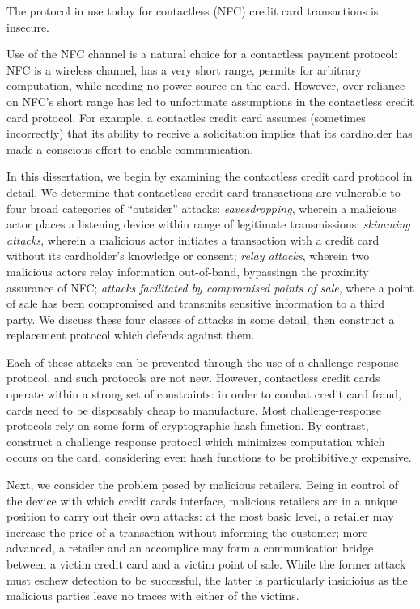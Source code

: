 The protocol in use today for contactless (NFC) credit card transactions is insecure.

Use of the NFC channel is a natural choice for a contactless payment protocol:
    NFC is a wireless channel, has a very short range, permits for arbitrary computation, while needing no power source on the card.
However, over-reliance on NFC's short range has led to unfortunate assumptions in the contactless credit card protocol.
For example, a contactles credit card assumes (sometimes incorrectly) that its ability to receive a solicitation implies that its cardholder has made a conscious effort to enable communication.

In this dissertation, we begin by examining the contactless credit card protocol in detail.
We determine that contactless credit card transactions are vulnerable to four broad categories of ``outsider'' attacks:
    \emph{eavesdropping}, wherein a malicious actor places a listening device within range of legitimate transmissions;
    \emph{skimming attacks}, wherein a malicious actor initiates a transaction with a credit card without its cardholder's knowledge or consent;
    \emph{relay attacks}, wherein two malicious actors relay information out-of-band, bypassingn the proximity assurance of NFC;
    \emph{attacks facilitated by compromised points of sale}, where a point of sale has been compromised and transmits sensitive information to a third party.
We discuss these four classes of attacks in some detail, then construct a replacement protocol which defends against them.

Each of these attacks can be prevented through the use of a challenge-response protocol, and such protocols are not new.
However, contactless credit cards operate within a strong set of constraints:
    in order to combat credit card fraud, cards need to be disposably cheap to manufacture.
Most challenge-response protocols rely on some form of cryptographic hash function.
By contrast, construct a challenge response protocol which minimizes computation which occurs on the card,
    considering even hash functions to be prohibitively expensive.

Next, we consider the problem posed by malicious retailers.
Being in control of the device with which credit cards interface, malicious retailers are in a unique position to carry out their own attacks:
  at the most basic level, a retailer may increase the price of a transaction without informing the customer;
  more advanced, a retailer and an accomplice may form a communication bridge between a victim credit card and a victim point of sale.
While the former attack must eschew detection to be successful, the latter is particularly insidioius as the malicious parties leave no traces with either of the victims.

